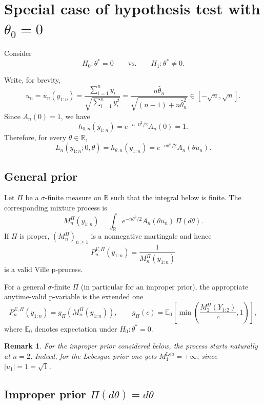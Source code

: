 \documentclass{article}%
\newtheorem{remark}[theorem]{Remark}
\newcommand{\E}{\mathbb{E}}
\begin{document}
\section{Special case of hypothesis test with $\theta_0=0$}

Consider
\[
H_0:\theta^*=0 \qquad \text{vs.}\qquad H_1:\theta^*\neq 0.
\]

Write, for brevity,
\[
u_n=u_n(y_{1:n})=\frac{\sum_{i=1}^n y_i}{\sqrt{\sum_{i=1}^n y_i^2}}
=\frac{n\hat\theta_n}{\sqrt{(n-1)+n\hat\theta_n^2}}\in[-\sqrt n,\sqrt n].
\]
Since $A_n(0)=1$, we have
\[
h_{0,n}(y_{1:n})=e^{-n\cdot 0^2/2}A_n(0)=1.
\]
Therefore, for every $\theta\in\mathbb R$,
\[
L_n(y_{1:n};0,\theta)=h_{\theta,n}(y_{1:n})
=e^{-n\theta^2/2}A_n(\theta u_n).
\]

\subsection{General prior}

Let $\Pi$ be a $\sigma$-finite measure on $\mathbb R$ such that the integral below is finite. The corresponding mixture process is
\begin{equation}\label{eq:Mn-general-zero}
M_n^\Pi(y_{1:n})
=
\int_{\mathbb R} e^{-n\theta^2/2}A_n(\theta u_n)\,\Pi(d\theta).
\end{equation}
If $\Pi$ is proper, $(M_n^\Pi)_{n\ge 1}$ is a nonnegative martingale and hence
\[
P_n^{V,\Pi}(y_{1:n})=\frac{1}{M_n^\Pi(y_{1:n})}
\]
is a valid Ville p-process.

For a general $\sigma$-finite $\Pi$ (in particular for an improper prior), the appropriate anytime-valid p-variable is the extended one
\begin{equation}\label{eq:extended-p-general-zero}
P_n^{E,\Pi}(y_{1:n})=g_\Pi(M_n^\Pi(y_{1:n})),
\qquad
g_\Pi(c)=\E_{0}\!\left[\min\!\left(\frac{M_2^\Pi(Y_{1:2})}{c},1\right)\right],
\end{equation}
where $\E_0$ denotes expectation under $H_0:\theta^*=0$.

\begin{remark}
For the improper prior considered below, the process starts naturally at $n=2$. Indeed, for the Lebesgue prior one gets $M_1^{\mathrm{Leb}}=+\infty$, since $|u_1|=1=\sqrt 1$.
\end{remark}

\subsection{Improper prior $\Pi(d\theta)=d\theta$}
\end{document}
